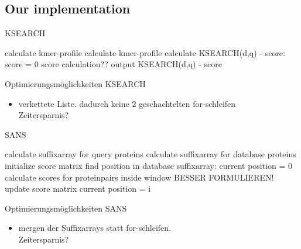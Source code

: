 \documentclass[aspectratio=1610]{beamer}
\begin{document}
\subsection{Our implementation}

\begin{frame}{KSEARCH}
 \begin{algorithmic}
        \State calculate kmer-profile
           \State calculate kmer-profile
           \State calculate KSEARCH(d,q) - score:
           \State score = 0
             \State score calculation??
           \EndFor
         \State output KSEARCH(d,q) - score
         \EndFor
      \EndFor     
    \EndFunction
  \end{algorithmic}
\end{frame}

\begin{frame}{Optimierungsmöglichkeiten KSEARCH}
  \begin{itemize}
    \item verkettete Liste. dadurch keine 2 geschachtelten for-schleifen\\
          Zeitersparnis?
  \end{itemize}
\end{frame}

\begin{frame}{SANS}
 \begin{algorithmic}
     \State calculate suffixarray for query proteins
     \State calculate suffixarray for database proteins
     \State initialize score matrix
       \State find position in database suffixarray:
       \State current position = 0
           \State calculate scores for proteinpairs inside window  BESSER FORMULIEREN!
           \State update score matrix 
           \State current position = i
         \EndIf
       \EndFor
     \EndFor
    \EndFunction
  \end{algorithmic} 
\end{frame}

\begin{frame}{Optimierungsmöglichkeiten SANS}
  \begin{itemize}
    \item mergen der Suffixarrays statt for-schleifen.\\
          Zeitersparnis?    
  \end{itemize}
\end{frame}
\end{document}
